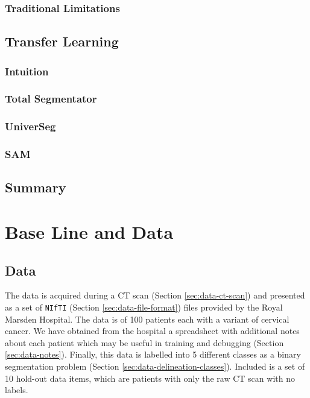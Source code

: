 \documentclass[11pt,twoside]{report}
\begin{document}
\subsection{Traditional Limitations}\label{sect:vanilla-limitations}

\section{Transfer Learning}\label{sect:transfer-learning}

\subsection{Intuition}\label{sect:transfer-learning-intuition}

\subsection{Total Segmentator}\label{sect:totalseg}

\subsection{UniverSeg}\label{sect:universeg}

\subsection{SAM}\label{sect:sam}

\section{Summary}\label{sect:background-summary}

\chapter{Base Line and Data}\label{sect:baseline-and-data}

\section{Data}\label{sect:data}

The data is acquired during a CT scan (Section \ref{sec:data-ct-scan}) and presented as a set of \texttt{NIfTI} (Section \ref{sec:data-file-format}) files provided by the Royal Marsden Hospital. The data is of 100 patients each with a variant of cervical cancer. We have obtained from the hospital a spreadsheet with additional notes about each patient which may be useful in training and debugging (Section \ref{sec:data-notes}). Finally, this data is labelled into 5 different classes as a binary segmentation problem (Section \ref{sec:data-delineation-classes}). Included is a set of 10 hold-out data items, which are patients with only the raw CT scan with no labels.
\end{document}
